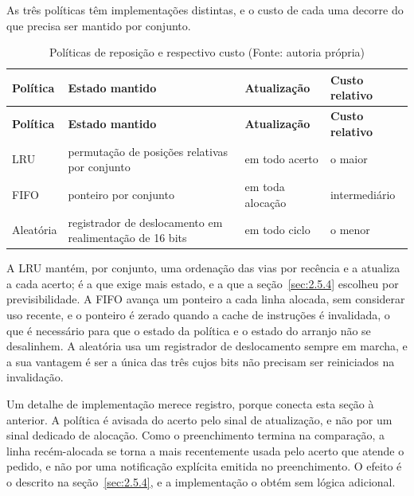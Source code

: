 As três políticas têm implementações distintas, e o custo de cada uma decorre do que precisa ser mantido por conjunto.

{\small
\begin{longtable}{@{}>{\raggedright\arraybackslash}p{}>{\raggedright\arraybackslash}p{}>{\raggedright\arraybackslash}p{}>{\raggedright\arraybackslash}p{}@{}}
\caption[Políticas de reposição e respectivo custo]{Políticas de reposição e respectivo custo (Fonte: autoria própria)}\label{tab:5.3}\\
\hline
\textbf{Política} & \textbf{Estado mantido} & \textbf{Atualização} & \textbf{Custo relativo} \\
\hline
\endfirsthead
\hline
\textbf{Política} & \textbf{Estado mantido} & \textbf{Atualização} & \textbf{Custo relativo} \\
\hline
\endhead
\hline
\endlastfoot
LRU & permutação de posições relativas por conjunto & em todo acerto & o maior \\
FIFO & ponteiro por conjunto & em toda alocação & intermediário \\
Aleatória & registrador de deslocamento em realimentação de 16 bits & em todo ciclo & o menor \\
\end{longtable}
}

A LRU mantém, por conjunto, uma ordenação das vias por recência e a atualiza a cada acerto; é a que exige mais estado, e a que a seção~\ref{sec:2.5.4} escolheu por previsibilidade. A FIFO avança um ponteiro a cada linha alocada, sem considerar uso recente, e o ponteiro é zerado quando a cache de instruções é invalidada, o que é necessário para que o estado da política e o estado do arranjo não se desalinhem. A aleatória usa um registrador de deslocamento sempre em marcha, e a sua vantagem é ser a única das três cujos bits não precisam ser reiniciados na invalidação.

Um detalhe de implementação merece registro, porque conecta esta seção à anterior. A política é avisada do acerto pelo sinal de atualização, e não por um sinal dedicado de alocação. Como o preenchimento termina na comparação, a linha recém-alocada se torna a mais recentemente usada pelo acerto que atende o pedido, e não por uma notificação explícita emitida no preenchimento. O efeito é o descrito na seção~\ref{sec:2.5.4}, e a implementação o obtém sem lógica adicional.

